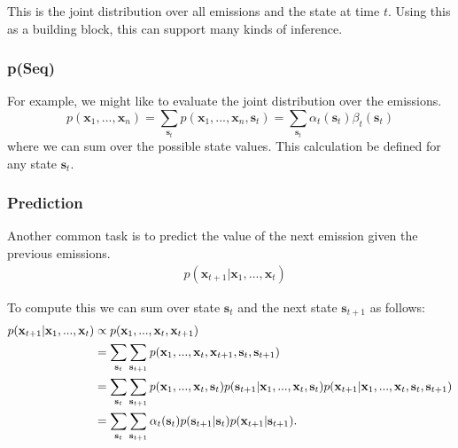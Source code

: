 This is the joint distribution over all emissions and the state at time $t$. Using this as a building block, this can support many kinds of inference.


\subsubsection{p(Seq)}

For example, we might like to evaluate the joint distribution over the emissions.
%
\begin{equation} \label{joint-fn}
  p(\textbf{x}_1, ..., \textbf{x}_n) = \sum_{\textbf{s}_t}p(\textbf{x}_1, ..., \textbf{x}_n, \textbf{s}_t)=
\sum_{\textbf{s}_t}
  \alpha_t(\textbf{s}_t) \beta_t(\textbf{s}_t)
\end{equation}
where we can sum over the possible state values. This calculation be defined for any state $\textbf{s}_t$.

\subsubsection{Prediction}

Another common task is to predict the value of the next emission given the previous emissions.
%
\begin{align*} 
&	p(\textbf{x}_{t+1} | \textbf{x}_1, ..., \textbf{x}_t)
\end{align*}

To compute this we can sum over state $\textbf{s}_t$ and the
next state $\textbf{s}_{t+1}$ as follows:
%
\begin{align}
  p(\textbf{x}_{t+1} | \textbf{x}_1, ..., \textbf{x}_t) &\propto   p(\textbf{x}_1, ..., \textbf{x}_t, \textbf{x}_{t+1} )\notag
  \\
                                                        &=  \sum_{\textbf{s}_t} \sum_{\textbf{s}_{t+1}} p(\textbf{x}_1, ..., \textbf{x}_t, \textbf{x}_{t+1}, \textbf{s}_t, \textbf{s}_{t+1})\label{eq:dp33hmm}
  \\
  &= \sum_{\textbf{s}_t} \sum_{\textbf{s}_{t+1}} p(\textbf{x}_1, ..., \textbf{x}_t, \textbf{s}_t) p(\textbf{s}_{t+1} | \textbf{x}_1, ..., \textbf{x}_t, \textbf{s}_t) p(\textbf{x}_{t+1} | \textbf{x}_1, ..., \textbf{x}_t, \textbf{s}_t,\textbf{s}_{t+1}) \label{eq:dp44hmm}\\
	&= \sum_{\textbf{s}_t} \sum_{\textbf{s}_{t+1}} \alpha_{t}(\textbf{s}_t) p(\textbf{s}_{t+1} | \textbf{s}_t) p(\textbf{x}_{t+1} | \textbf{s}_{t+1}).\label{eq:dp55hmm}
\end{align}

